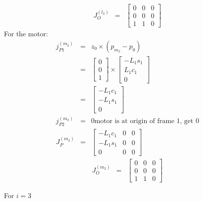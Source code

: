 \documentclass{article}
\begin{document}
\begin{eqnarray*}
	J_{O}^{(l_2)} &=& \begin{bmatrix} 0 & 0 & 0 \\ 0 & 0 & 0 \\ 1 & 1 & 0 \end{bmatrix}
\end{eqnarray*}
For the motor:
\begin{eqnarray*}
	j_{P1}^{(m_2)} &=& z_0\times\left( p_{m_2} - p_0 \right) \\
		       &=& \begin{bmatrix} 0 \\ 0 \\ 1 \end{bmatrix} \times \begin{bmatrix} -L_1 s_1 \\ L_1 c_1 \\ 0 \end{bmatrix} \\
		       &=& \begin{bmatrix}-L_1c_1 \\ -L_1s_1 \\ 0 \end{bmatrix} \\
	j_{P2}^{(m_2)} &=& 0 \text{motor is at origin of frame 1, get 0} \\
	J_{P}^{(m_2)} &=& \begin{bmatrix} -L_1 c_1 & 0 & 0 \\ -L_1 s_1 & 0 & 0 \\ 0 & 0 & 0 \end{bmatrix}
\end{eqnarray*}
\begin{eqnarray*}
	J_{O}^{(m_2)} &=& \begin{bmatrix} 0 & 0 & 0 \\ 0 & 0 & 0 \\ 1 & 1 & 0 \end{bmatrix}
\end{eqnarray*}

For $i = 3$
\end{document}
